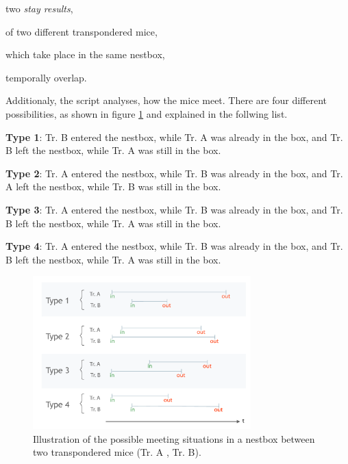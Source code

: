 \begin{mylist}
\item two \textit{stay results},
\item of two different transpondered mice,
\item which take place in the same nestbox,
\item temporally overlap.
\end{mylist}

Additionaly, the script analyses, how the mice meet. There are four different possibilities, as shown in figure \ref{fig:meeting_types} and explained in the follwing list.

\begin{mydesc}
\item \textbf{Type 1}: Tr. B entered the nestbox, while Tr. A was already in the box, and Tr. B left the nestbox, while Tr. A was still in the box. 
\item \textbf{Type 2}: Tr. A entered the nestbox, while Tr. B was already in the box, and Tr. A left the nestbox, while Tr. B was still in the box. 
\item \textbf{Type 3}: Tr. A entered the nestbox, while Tr. B was already in the box, and Tr. B left the nestbox, while Tr. A was still in the box. 
\item \textbf{Type 4}: Tr. A entered the nestbox, while Tr. B was already in the box, and Tr. B left the nestbox, while Tr. A was still in the box. 
\end{mydesc}

\begin{figure}[htpb]
\begin{center}
  \includegraphics[width=0.75\textwidth]{assets/pdf/meeting_types_schema.pdf}
  \caption[Meeting resulst types illusttration]{Illustration of the possible meeting situations in a nestbox between two transpondered mice (Tr. A , Tr. B).}
  \label{fig:meeting_types}
\end{center}
\end{figure}


